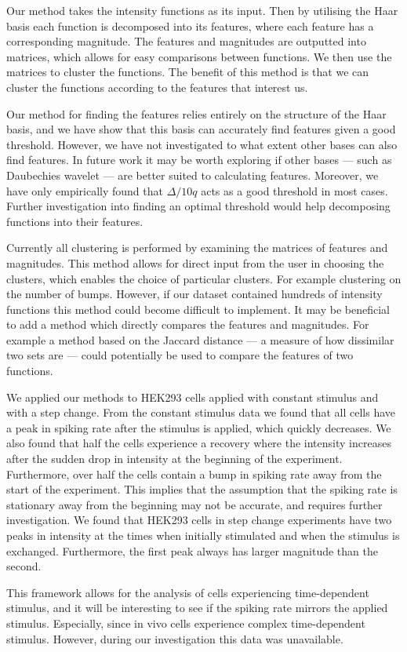 \documentclass[12pt]{book} %
\begin{document}
Our method takes the intensity functions as its input. Then by utilising the Haar basis each function is decomposed into its features, where each feature has a corresponding magnitude. The features and magnitudes are outputted into matrices, which allows for easy comparisons between functions. We then use the matrices to cluster the functions. The benefit of this method is that we can cluster the functions according to the features that interest us.
 
Our method for finding the features relies entirely on the structure of the Haar basis, and we have show that this basis can accurately find features given a good threshold. However, we have not investigated to what extent other bases can also find features. In future work it may be worth exploring if other bases --- such as Daubechies wavelet --- are better suited to calculating features. Moreover, we have only empirically found that $\Delta/10q$ acts as a good threshold in most cases. Further investigation into finding an optimal threshold would help decomposing functions into their features. 

Currently all clustering is performed by examining the matrices of features and  magnitudes. This method allows for direct input from the user in choosing the clusters, which enables the choice of particular clusters. For example clustering on the number of bumps. However, if our dataset contained hundreds of intensity functions this method could become difficult to implement. It may be beneficial to add a method which directly compares the features and magnitudes. For example a method based on the Jaccard distance --- a measure of how dissimilar two sets are --- could potentially be used to compare the features of two functions. 

We applied our methods to HEK293 cells applied with constant stimulus and with a step change. From the constant stimulus data we found that all cells have a peak in spiking rate after the stimulus is applied, which quickly decreases. We also found that half the cells experience a recovery where the intensity increases after the sudden drop in intensity at the beginning of the experiment. Furthermore, over half the cells contain a bump in spiking rate away from the start of the experiment. This implies that the assumption that the spiking rate is stationary away from the beginning may not be accurate, and requires further investigation. We found that HEK293 cells in step change experiments have two peaks in intensity at the times when initially stimulated and when the stimulus is exchanged. Furthermore, the first peak always has larger magnitude than the second.  

This framework allows for the analysis of cells experiencing time-dependent stimulus, and it will be interesting to see if the spiking rate mirrors the applied stimulus. Especially, since in vivo cells experience complex time-dependent stimulus. However, during our investigation this data was unavailable. 
 

\end{document}
